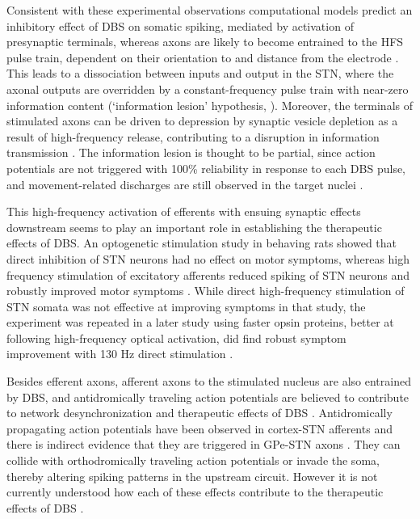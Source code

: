 %
%
%
%
%
%
%
Consistent with these experimental observations computational models predict
an inhibitory effect of DBS on somatic spiking, mediated by activation of
presynaptic terminals, whereas axons are likely to become
entrained to the HFS pulse train, dependent on their orientation to and distance
from the electrode \cite{mcintyre_cellular_2004,miocinovic_computational_2006}.
This leads to a dissociation between inputs and output in the STN, where the axonal outputs
are overridden by a constant-frequency pulse train with near-zero information content
(`information lesion' hypothesis, \cite{grill_deep_2004}). Moreover, the terminals
of stimulated axons can be driven to depression by synaptic vesicle depletion
as a result of high-frequency release, contributing to a disruption in information
transmission \cite{rosenbaum_axonal_2014}. The information lesion is thought
to be partial, since action potentials are not triggered with 100\% reliability
in response to each DBS pulse, and movement-related discharges are still observed
in the target nuclei \cite{agnesi_deep_2013,zimnik_movement-related_2015}.
%

This high-frequency activation of efferents with ensuing synaptic effects downstream
seems to play an important role in establishing the therapeutic effects of DBS.
An optogenetic stimulation study in behaving rats showed that direct inhibition of STN
neurons had no effect on motor symptoms, whereas high frequency stimulation of excitatory
afferents reduced spiking of STN neurons and robustly improved motor symptoms
\cite{gradinaru_optical_2009}. While direct high-frequency stimulation of STN somata
was not effective at improving symptoms in that study, the experiment was repeated in
a later study using faster opsin proteins, better at following high-frequency optical activation,
did find robust symptom improvement with 130 Hz direct stimulation \cite{yu_frequency-specific_2020}.

%
%
%
%
Besides efferent axons, afferent axons to the stimulated nucleus are also entrained
by DBS, and antidromically traveling action potentials are believed to contribute to
network desynchronization and therapeutic effects of DBS \cite{li_resonant_2007,li_therapeutic_2012}.
Antidromically propagating action potentials have been observed in cortex-STN
afferents \cite{li_resonant_2007} and there is indirect evidence that they are
triggered in GPe-STN axons \cite{hashimoto_stimulation_2003,agnesi_fidelity_2015}.
They can collide with orthodromically traveling action potentials or invade the soma,
thereby altering spiking patterns in the upstream circuit. However it is not
currently understood how each of these effects contribute to the therapeutic effects
of DBS \cite{jakobs_cellular_2019}.
%
%



